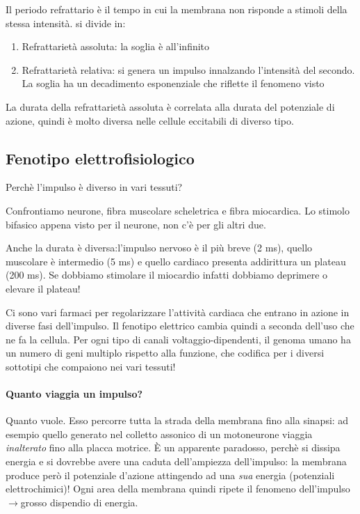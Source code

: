 \documentclass[a4paper,12pt]{article}
\newcommand{\lfreccia}{\ensuremath{\longrightarrow}}
\begin{document}
Il periodo refrattario è il tempo in cui la membrana non risponde a stimoli della stessa intensità. si divide in:
\begin{enumerate}
\item{Refrattarietà assoluta: la soglia è all'infinito}
\item{Refrattarietà relativa: si genera un impulso innalzando l'intensità del secondo. La soglia ha un decadimento esponenziale che riflette il fenomeno visto}
\end{enumerate}

La durata della refrattarietà assoluta è correlata alla durata del potenziale di azione, quindi è molto diversa nelle cellule eccitabili di diverso tipo.

\subsection{Fenotipo elettrofisiologico}
Perchè l'impulso è diverso in vari tessuti?

Confrontiamo neurone, fibra muscolare scheletrica e fibra miocardica. Lo stimolo bifasico appena visto per il neurone, non c'è per gli altri due.

Anche la durata è diversa:l'impulso nervoso è il più breve (2 ms), quello muscolare è intermedio (5 ms) e quello cardiaco presenta addirittura un plateau (200 ms). Se dobbiamo stimolare il miocardio infatti dobbiamo deprimere o elevare il plateau!

Ci sono vari farmaci per regolarizzare l'attività cardiaca che entrano in azione in diverse fasi dell'impulso.
Il fenotipo elettrico cambia quindi a seconda dell'uso che ne fa la cellula. 
Per ogni tipo di canali voltaggio-dipendenti, il genoma umano ha un numero di geni multiplo rispetto alla funzione, che codifica per i diversi sottotipi che compaiono nei vari tessuti!

\paragraph{Quanto viaggia un impulso?}

Quanto vuole. Esso percorre tutta la strada della membrana fino alla sinapsi: ad esempio quello generato nel colletto assonico di un motoneurone viaggia \emph{inalterato} fino alla placca motrice. È un apparente paradosso, perchè si dissipa energia e si dovrebbe avere una caduta dell'ampiezza dell'impulso: la membrana produce però il potenziale d'azione attingendo ad una \emph{sua} energia  (potenziali elettrochimici)! Ogni area della membrana quindi ripete il fenomeno dell'impulso \lfreccia grosso dispendio di energia.
\end{document}
